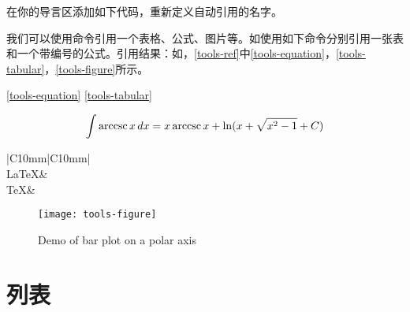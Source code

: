 在你的导言区添加如下代码，重新定义自动引用的名字。
\begin{latex}{}
\end{latex}

我们可以使用命令引用一个表格、公式、图片等。如使用如下命令分别引用一张表和一个带编号的公式。引用结果：如，\autoref{tools-ref}中\autoref{tools-equation}，\autoref{tools-tabular}，\autoref{tools-figure}所示。

\begin{latex}{}
\ref{tools-equation}
\ref{tools-tabular}
\end{latex}

\begin{equation}\label{tools-equation}
\int \operatorname{arccsc} x\,dx=x \operatorname{arccsc} x+\ln(x+\sqrt{x^2-1}+C)
\end{equation}

\begin{table}[!ht]
\begin{center}
	\caption{\TeX 家族标识符}
	\label{tools-tabular}
	\begin{tabular}{|C{10mm}|C{10mm}|}
		\hline
		\\
		\hline
		\LaTeX & \LaTeXe\\
		\hline
		\TeX & \XeLaTeX\\
		\hline
	\end{tabular}
\end{center}
\end{table}

\begin{figure}[!ht]
	\begin{center}
		\texttt{[image: tools-figure]}
		\caption{Demo of bar plot on a polar axis}
		\label{tools-figure}
	\end{center}
\end{figure}



\section{列表}
